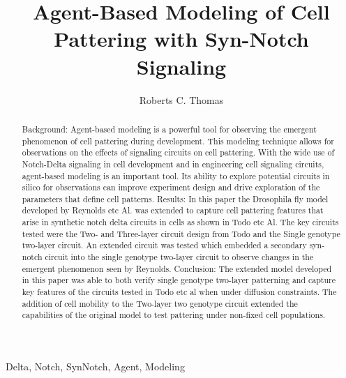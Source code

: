 \documentclass[12pt]{ifacconf}
\begin{document}
\begin{frontmatter}


\title{Agent-Based Modeling of Cell Pattering with Syn-Notch Signaling} 



\author[First]{Roberts C. Thomas} 


\address[First]{Cornell University, 
Ithaca, NY 14850 USA (e-mail: tcr55@cornell.edu).}


\begin{abstract} %
\begin{bfseries}
{\large Background:} Agent-based modeling is a powerful tool for observing the emergent phenomenon of cell pattering during development. This modeling technique allows for observations on the effects of signaling circuits on cell pattering. With the wide use of Notch-Delta signaling in cell development and in engineering cell signaling circuits, agent-based modeling is an important tool. Its ability to explore potential circuits in silico for observations can improve experiment design and drive exploration of the parameters that define cell patterns.
{\large Results:} In this paper the Drosophila fly model developed by Reynolds etc Al. was extended to capture cell pattering features that arise in synthetic notch delta circuits in cells as shown in Todo etc Al. The key circuits tested were the Two- and Three-layer circuit design from Todo and the Single genotype two-layer circuit. An extended circuit was tested which embedded a secondary syn-notch circuit into the single genotype two-layer circuit to observe changes in the emergent phenomenon seen by Reynolds.
{\large Conclusion:} The extended model developed in this paper was able to both verify single genotype two-layer patterning and capture key features of the circuits tested in Todo etc al when under diffusion constraints. The addition of cell mobility to the Two-layer two genotype circuit extended the capabilities of the original model to test pattering under non-fixed cell populations.
\end{bfseries}
\end{abstract}

\begin{keyword}
Delta, Notch, SynNotch, Agent, Modeling
\end{keyword}

\end{frontmatter}
\end{document}

